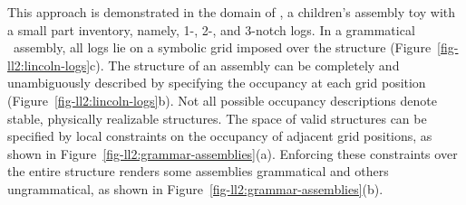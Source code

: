 This approach is demonstrated in the domain of \LincolnLogs, a children's
assembly toy with a small part inventory, namely, 1-, 2-, and 3-notch
logs.
%
In a grammatical \LincolnLog\ assembly, all logs lie on a symbolic grid imposed
over the structure (Figure~\ref{fig-ll2:lincoln-logs}c).
%
The structure of an assembly can be completely and unambiguously described by
specifying the occupancy at each grid position
(Figure~\ref{fig-ll2:lincoln-logs}b).
%
Not all possible occupancy descriptions denote stable, physically realizable
structures.
%
The space of valid structures can be specified by local constraints on the
occupancy of adjacent grid positions, as shown in
Figure~\ref{fig-ll2:grammar-assemblies}(a).
%
Enforcing these constraints over the entire structure renders some assemblies
grammatical and others ungrammatical, as shown in
Figure~\ref{fig-ll2:grammar-assemblies}(b).

